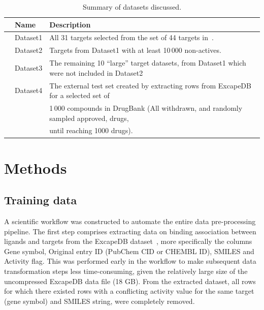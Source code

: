 \documentclass[10pt,article]{memoir}
\begin{document}
\begin{table}[h]
\small
\centering
\caption{Summary of datasets discussed.}
\label{tbl:datasets}
\begin{tabular}{rll}
\toprule
& Name     & Description \\
\midrule
& Dataset1 & All 31 targets selected from the set of 44 targets in~\cite{Bowes2012}. \\
& Dataset2 & Targets from Dataset1 with at least 10\,000 non-actives. \\
& Dataset3 & The remaining 10 ``large'' target datasets, from Dataset1 which were not included in Dataset2 \\
& Dataset4 & The external test set created by extracting rows from ExcapeDB for a selected set of \\
&          & 1\,000 compounds in DrugBank (All withdrawn, and randomly sampled approved, drugs,\\
&          & until reaching 1000 drugs). \\
\bottomrule
\end{tabular}
\end{table}

\section*{Methods}

\subsection*{Training data}

A scientific workflow was constructed to automate the entire data
pre-processing pipeline.  The first step comprises extracting data on binding association
between ligands and targets from the ExcapeDB dataset~\cite{Sun2017}, more
specifically the columns Gene symbol, Original entry ID (PubChem CID or CHEMBL
ID), SMILES and Activity flag. This was performed early in the workflow to make
subsequent data transformation steps less time-consuming, given the relatively large
size of the uncompressed ExcapeDB data file (18 GB).
%
From the extracted dataset, all rows for which there existed rows with a conflicting
activity value for the same target (gene symbol) and SMILES string, were completely removed.
\end{document}
